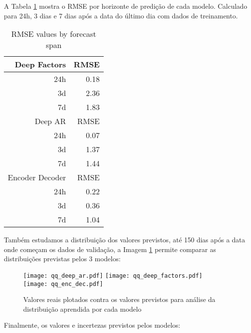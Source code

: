 

A Tabela \ref{tab:rmse} mostra o RMSE por horizonte de predição de cada modelo.
Calculado para 24h, 3 dias e 7 dias após a data do último dia com dados de treinamento.


\begin{center}
\begin{table}[htbp]
\caption{\label{tab:rmse}
RMSE values by forecast span}
\centering
\begin{tabular}{rr}
\hline
Deep Factors & RMSE\\
\hline
24h & 0.18\\
3d & 2.36\\
7d & 1.83\\
\hline
Deep AR & RMSE\\
\hline
24h & 0.07\\
3d & 1.37\\
7d & 1.44\\
\hline
Encoder Decoder & RMSE\\
\hline
24h & 0.22\\
3d & 0.36\\
7d & 1.04\\
\end{tabular}
\end{table}
\end{center}


Também estudamos a distribuição dos valores previstos, até 150 dias após a data onde começam os dados de validação, a Imagem \ref{fig:distr} permite comparar as distribuições previstas pelos 3 modelos:

\begin{figure}[H]
\label{fig:distr}
\centering
\texttt{[image: qq\_deep\_ar.pdf]} \hfill
\texttt{[image: qq\_deep\_factors.pdf]} \hfill
\texttt{[image: qq\_enc\_dec.pdf]} 
\caption{Valores reais plotados contra os valores previstos para análise da distribuição aprendida por cada modelo} 
\end{figure}


Finalmente, os valores e incertezas previstos pelos modelos:



